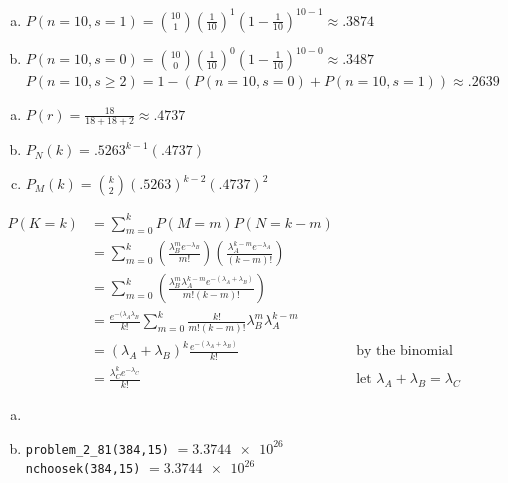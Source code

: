 \documentclass[12pt]{article}
\newenvironment{problem}[2][Problem]{\begin{trivlist}
\item[\hskip \labelsep {\bfseries #1}\hskip \labelsep {\bfseries #2.}]
  \vspace{1 cm}
}{\end{trivlist}}
\begin{document}
\begin{problem}{2.63} 
\item
  \begin{enumerate}[a.]
    \item %
      $P(n=10,s=1) = \binom{10}{1}(\frac{1}{10})^1(1-\frac{1}{10})^{10-1} \approx .3874$
    \item %
      $P(n=10,s=0) = \binom{10}{0}(\frac{1}{10})^0(1-\frac{1}{10})^{10-0} \approx .3487$ \\
      $P(n=10,s\geq2) = 1 - (P(n=10,s=0) + P(n=10,s=1)) \approx .2639$
  \end{enumerate}
\end{problem}

\begin{problem}{2.65}
\item
  \begin{enumerate}[a.]
    \item %
     $P(r) = \frac{18}{18+18+2} \approx .4737$
   \item %
     $P_N(k) = .5263^{k-1}(.4737)$
   \item %
     $P_M(k) = \binom{k}{2}(.5263)^{k-2}(.4737)^2$
  \end{enumerate}
\end{problem}

\begin{problem}{2.67}
\item
  \begin{align*}
    P(K = k) &= \sum_{m=0}^k P(M=m)P(N=k-m) \\
    &= \sum_{m=0}^k \left( \frac{\lambda_B^m e^{-\lambda_B}}{m!} \right)
    \left( \frac{\lambda_A^{k-m} e^{-\lambda_A}}{(k-m)!} \right) \\
    &= \sum_{m=0}^k \left( \frac{\lambda_B^m \lambda_A^{k-m} e^{-(\lambda_A+\lambda_B)}}{m!(k-m)!} \right) \\
    &= \frac{e^{-(\lambda_A \lambda_B}}{k!} \sum_{m=0}^{k} \frac{k!}{m!(k-m)!}\lambda_B^m \lambda_A^{k-m} \\
    &= (\lambda_A + \lambda_B)^k \frac{e^{-(\lambda_A + \lambda_B)}}{k!} & & \textrm{by the binomial expansion} \\
    &= \frac{\lambda_C^k e^{-\lambda_C}}{k!} & & \textrm{let } \lambda_A + \lambda_B = \lambda_C
  \end{align*}
\end{problem}

\begin{problem}{2.81} 
\item
  \begin{enumerate}[a.]
    \item %
      
    \item %
      \verb|problem_2_81(384,15)| $ = \num{3.3744e26}$ \\
      \verb|nchoosek(384,15)| $ = \num{3.3744e26} $ 
  \end{enumerate}
\end{problem}
\end{document}
